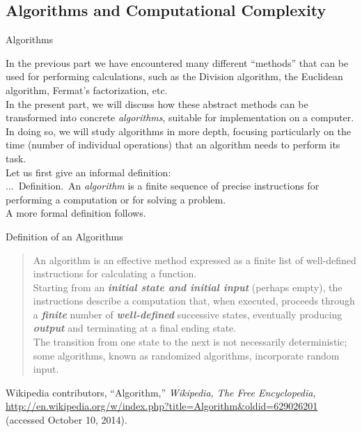 \documentclass[smaller,hyperref={CJKbookmarks=true}]{beamer}
\newcounter{zhuo}[subsection]
\renewcommand{\thezhuo}{\thesection.\thesubsection.\arabic{zhuo}}
\newenvironment{DEFINITION}{\stepcounter{zhuo}\alert{\thezhuo.~Definition.\,}}{}
\begin{document}
\subsection{Algorithms and Computational Complexity}
\begin{frame}[c] \begin{spacing}{2.5}
\tableofcontents[sectionstyle=hide,subsectionstyle=show/shaded/hide] \end{spacing}
\end{frame}
\begin{frame}[c]{Algorithms}
\begin{spacing}{1.1}
In the previous part we have encountered many different ``methods'' that
can be used for performing calculations, such as the Division algorithm,
the Euclidean algorithm, Fermat's factorization, etc.\\[5pt]
In the present part, we will discuss how these abstract methods can be
transformed into concrete \emph{algorithms}, suitable for implementation on a
computer. In doing so, we will study algorithms in more depth, focusing
particularly on the time (number of individual operations) that an
algorithm needs to perform its task.\\[4pt]
Let us first give an informal definition:\\[4pt]
\begin{DEFINITION}
An \emph{algorithm} is a finite sequence of precise instructions for performing a computation or for solving a problem.\\[4pt]
A more formal definition follows.
\end{DEFINITION}
\end{spacing}
\end{frame}
\begin{frame}[t]{Definition of an Algorithms}
\begin{spacing}{1.1}
\begin{quote}
An algorithm is an effective method expressed as a finite list of
well-defined instructions for calculating a function.\\[5pt]
Starting from an \textit{\textbf{initial state and initial input}} (perhaps
empty), the instructions describe a computation that, when
executed, proceeds through a \textit{\textbf{finite }} number of \textit{\textbf{well-defined}}
successive states, eventually producing \textit{\textbf{output}} and terminating
at a final ending state.\\[5pt]
The transition from one state to the next is not necessarily
deterministic; some algorithms, known as randomized algorithms,
incorporate random input.
\end{quote}
\begin{footnotesize}
Wikipedia contributors, ``Algorithm,'' \emph{Wikipedia, The Free Encyclopedia}, \url{http://en.wikipedia.org/w/index.php?title=Algorithm&oldid=629026201} (accessed October 10, 2014).
\end{footnotesize}
\end{spacing}
\end{frame}
\end{document}

